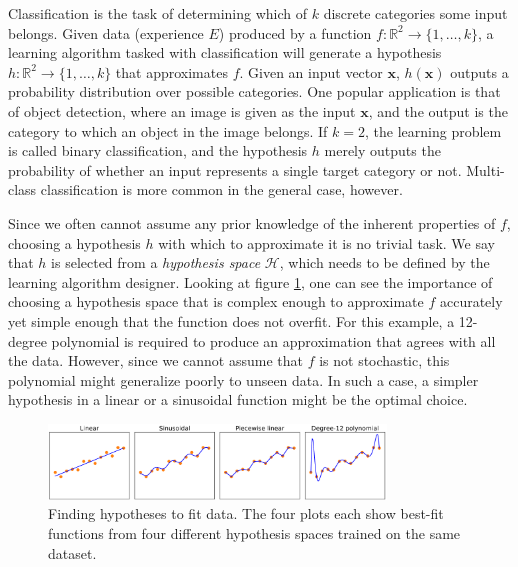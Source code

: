 Classification is the task of determining which of $k$ discrete categories some input belongs. Given data (experience $E$) produced by a function $f:\mathbb{R}^{2}\to\{1,\dots,k\}$, a learning algorithm tasked with classification will generate a hypothesis $h:\mathbb{R}^{2}\to\{1,\dots,k\}$ that approximates $f$. Given an input vector $\bm{x}$, $h(\bm{x})$ outputs a probability distribution over possible categories. One popular application is that of object detection, where an image is given as the input $\bm{x}$, and the output is the category to which an object in the image belongs. If $k=2$, the learning problem is called binary classification, and the hypothesis $h$ merely outputs the probability of whether an input represents a single target category or not. Multi-class classification is more common in the general case, however. 


Since we often cannot assume any prior knowledge of the inherent properties of $f$, choosing a hypothesis $h$ with which to approximate it is no trivial task. We say that $h$ is selected from a \textit{hypothesis space} $\mathcal{H}$, which needs to be defined by the learning algorithm designer. Looking at figure \ref{fig:bt_hypotheses}, one can see the importance of choosing a hypothesis space that is complex enough to approximate $f$ accurately yet simple enough that the function does not overfit. For this example, a 12-degree polynomial is required to produce an approximation that agrees with all the data. However, since we cannot assume that $f$ is not stochastic, this polynomial might generalize poorly to unseen data. In such a case, a simpler hypothesis in a linear or a sinusoidal function might be the optimal choice.

\begin{figure}[h]
    \centering
    \includegraphics[width=0.8\textwidth]{figures/bt_hypotheses.png}
    \caption{Finding hypotheses to fit data. The four plots each show best-fit functions from four different hypothesis spaces trained on the same dataset.}
    \label{fig:bt_hypotheses}
\end{figure}

